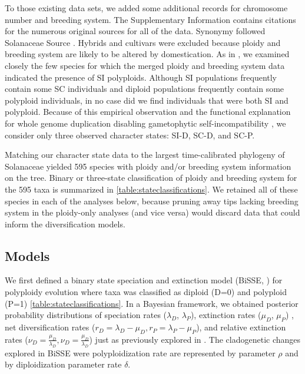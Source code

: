 To those existing data sets, we added some additional records for chromosome number and breeding system.
The Supplementary Information contains citations for the numerous original sources for all of the data. %
Synonymy followed Solanaceae Source \citep{solsource}.
Hybrids and cultivars were excluded because ploidy and breeding system are likely to be altered by domestication.
As in \citet{robertson_2011}, we examined closely the few species for which the merged ploidy and breeding system data indicated the presence of SI polyploids.
Although SI populations frequently contain some SC individuals and diploid populations frequently contain some polyploid individuals, in no case did we find individuals that were both SI and polyploid.
Because of this empirical observation and the functional explanation for whole genome duplication disabling gametophytic self-incompatibility \citep[reviewed in][]{ramsey_1998,stone_2002}, we consider only three observed character states: SI-D, SC-D, and SC-P.


Matching our character state data to the largest time-calibrated phylogeny of Solanaceae \citep{sarkinen_2013} yielded 595 species with ploidy and/or breeding system information on the tree.
Binary or three-state classification of ploidy and breeding system for the 595 taxa is summarized in \cref{table:stateclassifications}. %
We retained all of these species in each of the analyses below, because pruning away tips lacking breeding system in the ploidy-only analyses (and vice versa) would discard data that could inform the diversification models.

\subsection{Models}

We first defined a binary state speciation and extinction model (BiSSE, \citet{maddison_2007})  for polyploidy evolution where taxa was classified as diploid (D=0) and polyploid (P=1) \cref{table:stateclassifications}.
In a Bayesian framework, we obtained posterior probability distributions of speciation rates ($\lambda_D$, $\lambda_P$), extinction rates ($\mu_D$, $\mu_P$) , net diversification rates ($r_D=\lambda_D-\mu_D, r_P=\lambda_P-\mu_P$), and  relative extinction rates ($\nu_D=\frac{\mu_D}{\lambda_D}, \nu_D=\frac{\mu_D}{\lambda_D}$) just as previously explored in \citet{mayrose_2011}.
The cladogenetic changes explored in BiSSE were polyploidization rate are represented by parameter $\rho$ and by diploidization parameter rate $\delta$.


